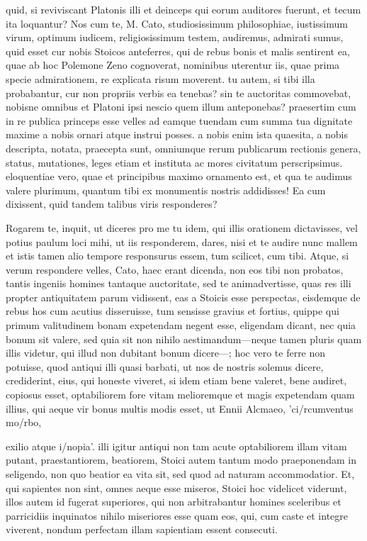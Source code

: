  quid, si reviviscant Platonis illi et deinceps qui eorum auditores fuerunt, et tecum ita loquantur? Nos cum te, M. Cato, studiosissimum philosophiae, iustissimum virum, optimum iudicem, religiosissimum testem, audiremus, admirati sumus, quid esset cur nobis Stoicos anteferres, qui de rebus bonis et malis sentirent ea, quae ab hoc Polemone Zeno cognoverat, nominibus uterentur iis, quae prima specie admirationem, re explicata risum moverent. tu autem, si tibi illa probabantur, cur non propriis verbis ea tenebas? sin te auctoritas commovebat, nobisne omnibus et Platoni ipsi nescio quem illum anteponebas? praesertim cum in re publica princeps esse velles ad eamque tuendam cum summa tua dignitate maxime a nobis ornari atque instrui posses. a nobis enim ista quaesita, a nobis descripta, notata, praecepta sunt, omniumque rerum publicarum rectionis genera, status, mutationes, leges etiam et instituta ac mores civitatum perscripsimus. eloquentiae vero, quae et principibus maximo ornamento est, et qua te audimus valere plurimum, quantum tibi ex monumentis nostris addidisses! Ea cum dixissent, quid tandem talibus viris responderes?

 Rogarem te, inquit, ut diceres pro me tu idem, qui illis orationem dictavisses, vel potius paulum loci mihi, ut iis responderem, dares, nisi et te audire nunc mallem et istis tamen alio tempore responsurus essem, tum scilicet, cum tibi. Atque, si verum respondere velles, Cato, haec erant dicenda, non eos tibi non probatos, tantis ingeniis homines tantaque auctoritate, sed te animadvertisse, quas res illi propter antiquitatem parum vidissent, eas a Stoicis esse perspectas, eisdemque de rebus hos cum acutius disseruisse, tum sensisse gravius et fortius, quippe qui primum valitudinem bonam expetendam negent esse, eligendam dicant, nec quia bonum sit valere, sed quia sit non nihilo aestimandum—neque tamen pluris quam illis videtur, qui illud non dubitant bonum dicere—; hoc vero te ferre non potuisse, quod antiqui illi quasi barbati, ut nos de nostris solemus dicere, crediderint, eius, qui honeste viveret, si idem etiam bene valeret, bene audiret, copiosus esset, optabiliorem fore vitam melioremque et magis expetendam quam illius, qui aeque vir bonus multis modis esset, ut Ennii Alcmaeo, 'ci/rcumventus mo/rbo,

 exilio atque i/nopia'. illi igitur antiqui non tam acute optabiliorem illam vitam putant, praestantiorem, beatiorem, Stoici autem tantum modo praeponendam in seligendo, non quo beatior ea vita sit, sed quod ad naturam accommodatior. Et, qui sapientes non sint, omnes aeque esse miseros, Stoici hoc videlicet viderunt, illos autem id fugerat superiores, qui non arbitrabantur homines sceleribus et parricidiis inquinatos nihilo miseriores esse quam eos, qui, cum caste et integre viverent, nondum perfectam illam sapientiam essent consecuti.

